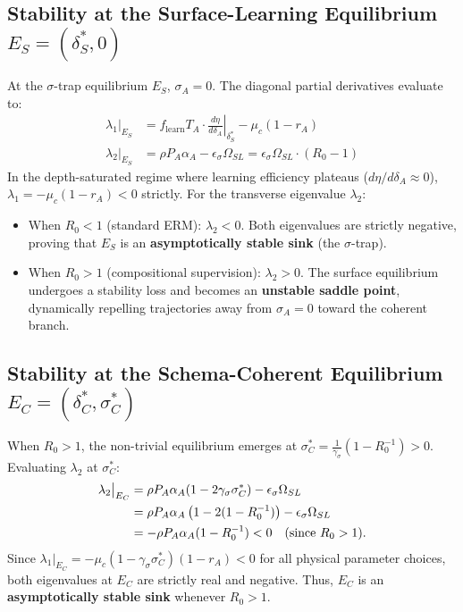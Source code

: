 \documentclass{article}
\theoremstyle{definition}
\begin{document}
\subsection{Stability at the Surface-Learning Equilibrium \texorpdfstring{$E_S = (\delta_S^*, 0)$}{ES = (deltaS*, 0)}}

At the $\sigma$-trap equilibrium $E_S$, $\sigma_A = 0$. The diagonal partial derivatives evaluate to:
\begin{align}
\lambda_1\big|_{E_S} &= f_{\text{learn}} T_A \cdot \left.\frac{d\eta}{d\delta_A}\right|_{\delta_S^*} - \mu_c (1 - r_A) \\
\lambda_2\big|_{E_S} &= \rho P_A \alpha_A - \epsilon_\sigma \Omega_{SL} = \epsilon_\sigma \Omega_{SL} \cdot (R_0 - 1)
\end{align}
In the depth-saturated regime where learning efficiency plateaus ($d\eta/d\delta_A \approx 0$), $\lambda_1 = -\mu_c(1-r_A) < 0$ strictly. 
For the transverse eigenvalue $\lambda_2$:
\begin{itemize}[nosep]
\item When $R_0 < 1$ (standard ERM): $\lambda_2 < 0$. Both eigenvalues are strictly negative, proving that $E_S$ is an \textbf{asymptotically stable sink} (the $\sigma$-trap).
\item When $R_0 > 1$ (compositional supervision): $\lambda_2 > 0$. The surface equilibrium undergoes a stability loss and becomes an \textbf{unstable saddle point}, dynamically repelling trajectories away from $\sigma_A = 0$ toward the coherent branch.
\end{itemize}

\subsection{Stability at the Schema-Coherent Equilibrium \texorpdfstring{$E_C = (\delta_C^*, \sigma_C^*)$}{EC = (deltaC*, sigmaC*)}}

When $R_0 > 1$, the non-trivial equilibrium emerges at $\sigma_C^* = \frac{1}{\gamma_\sigma}\left(1 - R_0^{-1}\right) > 0$. Evaluating $\lambda_2$ at $\sigma_C^*$:
\begin{align}
\lambda_2\big|_{E_C} &= \rho P_A \alpha_A (1 - 2\gamma_\sigma \sigma_C^*) - \epsilon_\sigma \Omega_{SL} \notag\\
&= \rho P_A \alpha_A \left( 1 - 2(1 - R_0^{-1}) \right) - \epsilon_\sigma \Omega_{SL} \notag\\
&= -\rho P_A \alpha_A (1 - R_0^{-1}) < 0 \quad (\text{since } R_0 > 1).
\end{align}
Since $\lambda_1\big|_{E_C} = -\mu_c (1 - \gamma_\sigma \sigma_C^*)(1 - r_A) < 0$ for all physical parameter choices, both eigenvalues at $E_C$ are strictly real and negative. Thus, $E_C$ is an \textbf{asymptotically stable sink} whenever $R_0 > 1$.
\end{document}
